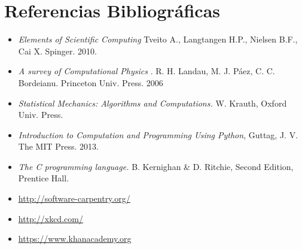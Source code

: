 \documentclass[11pt]{article}
\begin{document}
\newpage

\section*{Referencias Bibliogr\'aficas}

\begin{itemize}
\item
\textit{Elements of Scientific Computing}
Tveito A., Langtangen H.P., Nielsen B.F., Cai X. Spinger. 2010.
\item
\textit{A survey of Computational Physics}
. R. H. Landau, M. J. P\'aez, C. C. Bordeianu. Princeton Univ. Press. 2006
\item 
\textit{Statistical Mechanics: Algorithms and Computations.}
W. Krauth, Oxford Univ. Press. 
\item 
\textit{Introduction to Computation and Programming Using Python},
Guttag, J. V. The MIT Press. 2013.
\item 
\textit{The C programming language.}
 B. Kernighan \& D. Ritchie, Second Edition, Prentice Hall.
\item\url{http://software-carpentry.org/}
\item\url{http://xkcd.com/}
\item\url{https://www.khanacademy.org}
\end{itemize}

 
\end{document}
